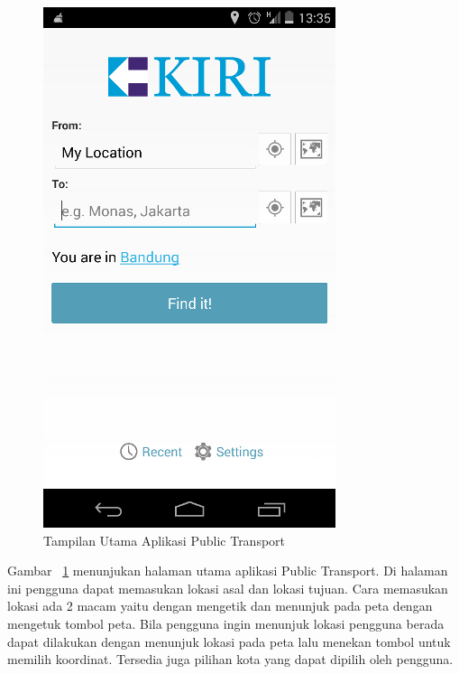 \begin{figure}[h]
	\centering
		\includegraphics[scale=0.5]{Gambar/KIRI_Android/home}
	\caption{Tampilan Utama Aplikasi Public Transport}
	\label{fig:home}
\end{figure}

Gambar ~\ref{fig:home} menunjukan halaman utama aplikasi Public Transport. Di halaman ini pengguna dapat memasukan lokasi asal dan lokasi tujuan. Cara memasukan lokasi ada 2 macam yaitu dengan mengetik dan menunjuk pada peta dengan mengetuk tombol peta. Bila pengguna ingin menunjuk lokasi pengguna berada dapat dilakukan dengan menunjuk lokasi pada peta lalu menekan tombol untuk memilih koordinat. Tersedia juga pilihan kota yang dapat dipilih oleh pengguna.

